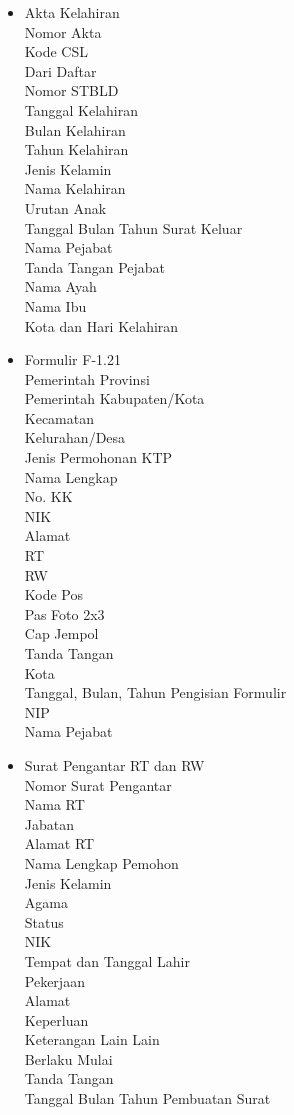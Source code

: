 \begin{itemize}
	\item Akta Kelahiran\\
		Nomor Akta\\
		Kode CSL\\
		Dari Daftar\\
		Nomor STBLD\\
		Tanggal Kelahiran\\
		Bulan Kelahiran\\
		Tahun Kelahiran\\
		Jenis Kelamin\\
		Nama Kelahiran\\
		Urutan Anak\\
		Tanggal Bulan Tahun Surat Keluar\\
		Nama Pejabat\\
		Tanda Tangan Pejabat\\
		Nama Ayah\\
		Nama Ibu\\
		Kota dan Hari Kelahiran
		
	\item Formulir F-1.21\\
		Pemerintah Provinsi\\
		Pemerintah Kabupaten/Kota\\
		Kecamatan\\
		Kelurahan/Desa\\
		Jenis Permohonan KTP\\
		Nama Lengkap\\
		No. KK\\
		NIK\\
		Alamat\\
		RT\\
		RW\\
		Kode Pos\\
		Pas Foto 2x3\\
		Cap Jempol\\
		Tanda Tangan\\
		Kota\\
		Tanggal, Bulan, Tahun Pengisian Formulir\\
		NIP\\
		Nama Pejabat

	\item Surat Pengantar RT dan RW\\
		Nomor Surat Pengantar\\
		Nama RT\\
		Jabatan\\
		Alamat RT\\
		Nama Lengkap Pemohon\\
		Jenis Kelamin\\
		Agama\\
		Status\\
		NIK\\
		Tempat dan Tanggal Lahir\\
		Pekerjaan\\
		Alamat\\
		Keperluan\\
		Keterangan Lain Lain\\
		Berlaku Mulai\\
		Tanda Tangan\\
		Tanggal Bulan Tahun Pembuatan Surat


\end{itemize}
